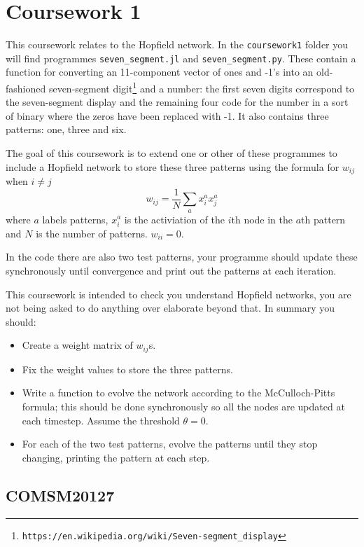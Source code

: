 \documentclass[12pt]{article}
\begin{document}
\section*{Coursework 1}

This coursework relates to the Hopfield network. In the \texttt{coursework1}
folder you will find programmes \texttt{seven\_segment.jl} and
\texttt{seven\_segment.py}. These contain a function for converting an
11-component vector of ones and -1's into an old-fashioned
seven-segment digit\footnote{\texttt{https://en.wikipedia.org/wiki/Seven-segment\_display}} and a number: the first seven digits correspond to
the seven-segment display and the remaining four code for the number
in a sort of binary where the zeros have been replaced with -1. It
also contains three patterns: one, three and six.

The goal of this coursework is to extend one or other of these
programmes to include a Hopfield network to store these three
patterns using the formula for $w_{ij}$ when $i\not=j$
\begin{equation}
w_{ij}=\frac{1}{N}\sum_a x_i^a x_j^a
\end{equation}
where $a$ labels patterns, $x_i^a$ is the activiation of the $i$th
node in the $a$th pattern and $N$ is the number of
patterns. $w_{ii}=0$.

In the code there are also two test patterns, your programme should
update these synchronously until convergence and print out the
patterns at each iteration. 


This coursework is intended to check you understand Hopfield networks,
you are not being asked to do anything over elaborate beyond that. In
summary you should:
\begin{itemize}
\item Create a weight matrix of $w_{ij}$s.
\item Fix the weight values to store the three patterns.
\item Write a function to evolve the network according to the
  McCulloch-Pitts formula; this should be done synchronously so all the nodes are updated at each timestep. Assume the threshold $\theta=0$.
\item For each of the two test patterns, evolve the patterns until they stop changing, printing the pattern at each step.
\end{itemize}

\subsection*{COMSM20127}
\end{document}
